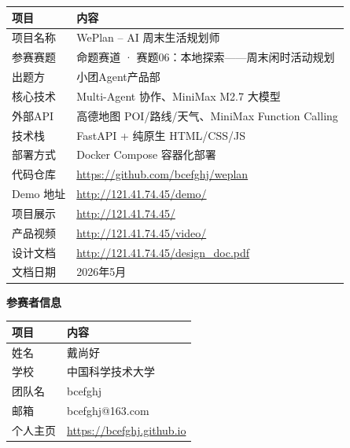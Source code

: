 \documentclass[12pt,a4paper]{ctexart}
\begin{document}
\begin{table}[H]
\centering
\renewcommand{\arraystretch}{1.6}
\begin{tabular}{p{4cm} p{8cm}}
\toprule
\textbf{项目} & \textbf{内容} \\
\midrule
项目名称 & WePlan -- AI 周末生活规划师 \\
参赛赛题 & 命题赛道 · 赛题06：本地探索——周末闲时活动规划 \\
出题方 & 小团Agent产品部 \\
核心技术 & Multi-Agent 协作、MiniMax M2.7 大模型 \\
外部API & 高德地图 POI/路线/天气、MiniMax Function Calling \\
技术栈 & FastAPI + 纯原生 HTML/CSS/JS \\
部署方式 & Docker Compose 容器化部署 \\
代码仓库 & \url{https://github.com/bcefghj/weplan} \\
Demo 地址 & \url{http://121.41.74.45/demo/} \\
项目展示 & \url{http://121.41.74.45/} \\
产品视频 & \url{http://121.41.74.45/video/} \\
设计文档 & \url{http://121.41.74.45/design_doc.pdf} \\
文档日期 & 2026年5月 \\
\bottomrule
\end{tabular}
\end{table}

\vspace{1.5cm}

\begin{center}
{\Large\bfseries 参赛者信息}
\end{center}

\vspace{0.5cm}

\begin{table}[H]
\centering
\renewcommand{\arraystretch}{1.6}
\begin{tabular}{p{4cm} p{8cm}}
\toprule
\textbf{项目} & \textbf{内容} \\
\midrule
姓名 & 戴尚好 \\
学校 & 中国科学技术大学 \\
团队名 & bcefghj \\
邮箱 & bcefghj@163.com \\
个人主页 & \url{https://bcefghj.github.io} \\
\bottomrule
\end{tabular}
\end{table}
\end{document}
